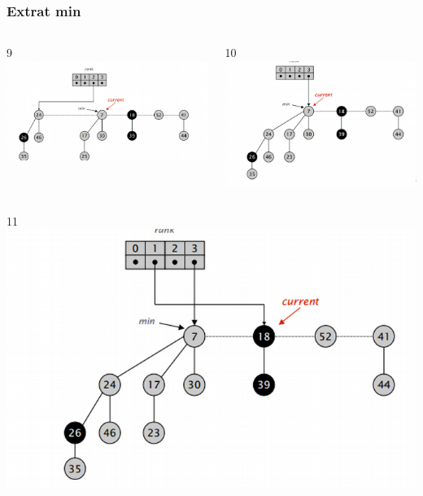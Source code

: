 \documentclass{beamer}
\begin{document}
 \begin{frame}
 \frametitle{Extrat min}
 \begin{columns}[t]
 9
    \includegraphics[width =1 \textwidth]{imagenes/delete9.png}
      
    10
    \includegraphics[width =1 \textwidth]{imagenes/delete10.png}

   \end{columns}
   \begin{columns}[t]
   11
    \includegraphics[width =1 \textwidth]{imagenes/delete11.png}
      

\end{columns}
\end{frame}
\end{document}
